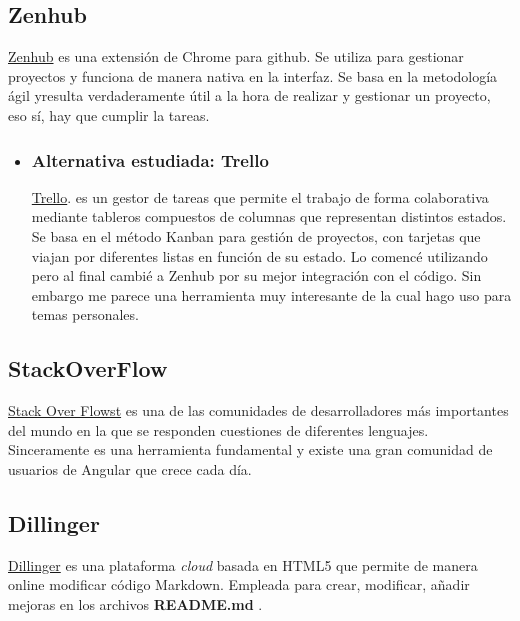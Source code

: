     \subsection{Zenhub}\label{otrasherramientas_zenhub}
    \hyperlink{https://www.zenhub.io/}{Zenhub} es una extensión de Chrome para github. Se utiliza para gestionar proyectos y funciona de manera nativa en la interfaz. Se basa en la metodología ágil yresulta verdaderamente útil a la hora de realizar y gestionar un proyecto, eso sí, hay que cumplir la tareas. 
    
    
\begin{itemize}
 	\item 	 \subsubsection{Alternativa estudiada: Trello}\label{trello}
\hyperlink{https://www.trello.com/}{Trello}.  es un gestor de tareas que permite el trabajo de forma colaborativa mediante tableros compuestos de columnas  que representan distintos estados. Se basa en el método Kanban para gestión de proyectos, con tarjetas que viajan por diferentes listas en función de su estado. Lo comencé utilizando pero al final cambié a Zenhub por su mejor integración con el código. Sin embargo me parece una herramienta muy interesante de la cual hago uso para temas personales.  
\end{itemize}

 \subsection{StackOverFlow}\label{otrasherramientas_dillinger}

\hyperlink{https://stackoverflow.com/}{Stack Over Flowst} es una de las comunidades de desarrolladores más importantes del mundo \cite{articulo2} en la que se responden cuestiones de diferentes lenguajes. Sinceramente es una herramienta fundamental y existe una gran comunidad de usuarios de Angular que crece cada día.


   \subsection{Dillinger}\label{otrasherramientas_dillinger}
    \hyperlink{https://www.zenhub.io/}{Dillinger} es una plataforma \emph{cloud}  basada en HTML5  que permite de manera online modificar código Markdown. Empleada para crear, modificar, añadir mejoras en los archivos \textbf{README.md} .
     
     




